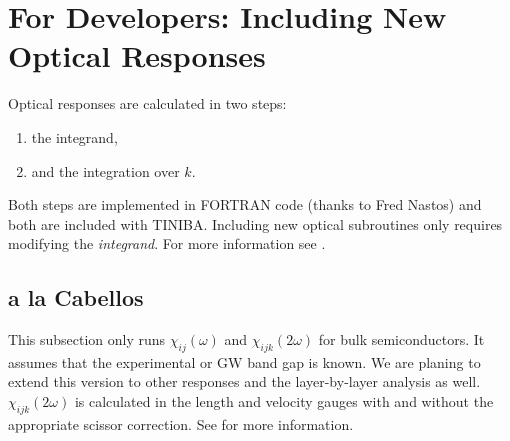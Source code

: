 \chapter{For Developers: Including New Optical Responses}

Optical responses are calculated in two steps:

\begin{enumerate}
\item the integrand,
\item and the integration over $k$.
\end{enumerate}

Both steps are implemented in FORTRAN code (thanks to Fred Nastos) and both are included with TINIBA. Including new optical subroutines only requires modifying the \emph{integrand}. For more information see \cite{sipe_second-order_2000}.

\section{a la Cabellos}

This subsection only runs $\chi_{ij}(\omega)$ and $\chi_{ijk}(2\omega)$ for bulk semiconductors. It assumes that the experimental or GW band gap is known. We are planing to extend this version to other responses and the layer-by-layer analysis as well. $\chi_{ijk}(2\omega)$ is calculated in the length and velocity gauges with and without the appropriate scissor correction. See \cite{cabellos_effects_2009} for more information.

